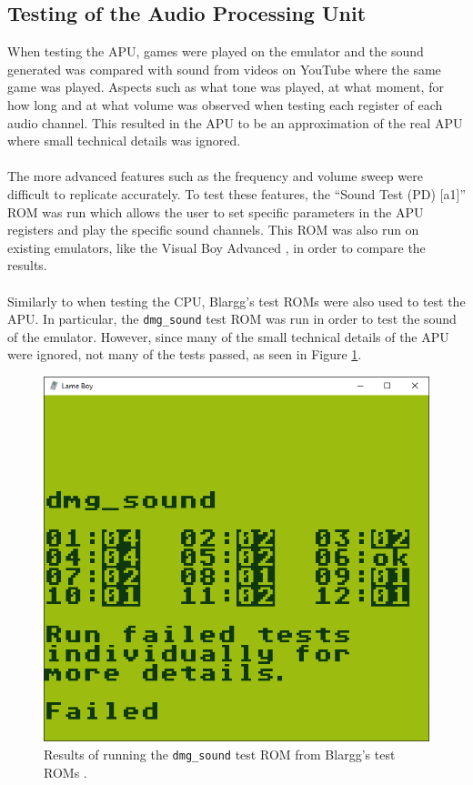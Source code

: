 \subsection{Testing of the Audio Processing Unit}
When testing the APU, games were played on the emulator and the sound generated was compared with sound from videos on YouTube where the same game was played. Aspects such as what tone was played, at what moment, for how long and at what volume was observed when testing each register of each audio channel. This resulted in the APU to be an approximation of the real APU where small technical details was ignored.
\\\\
The more advanced features such as the frequency and volume sweep were difficult to replicate accurately. To test these features, the ``Sound Test (PD) [a1]'' \cite{SountTestPD} ROM was run which allows the user to set specific parameters in the APU registers and play the specific sound channels. This ROM was also run on existing emulators, like the Visual Boy Advanced \cite{visualBoyAdvanced}, in order to compare the results.
\\\\
Similarly to when testing the CPU, Blargg's test ROMs \cite{Blargg} were also used to test the APU. In particular, the \texttt{dmg\_sound} test ROM was run in order to test the sound of the emulator. However, since many of the small technical details of the APU were ignored, not many of the tests passed, as seen in Figure \ref{fig:blargg_dmg_sound}.

\begin{figure}[H]
    \centering
    \includegraphics[width=\textwidth/2]{figures/APU/blargg_dmg_sound.PNG}
    \caption{Results of running the \texttt{dmg\_sound} test ROM from Blargg's test ROMs \cite{Blargg}.}
    \label{fig:blargg_dmg_sound}
\end{figure}
\newpage
